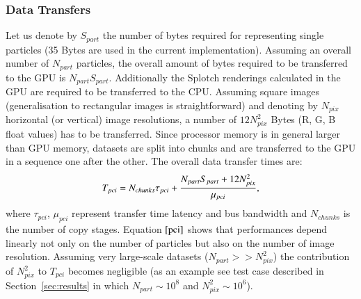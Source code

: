 \documentclass[1p]{elsarticle}
\begin{document}


\subsubsection{Data Transfers}
Let us denote by $S_{part}$ the number of bytes required for representing single particles (35 Bytes are used in the current implementation). Assuming an overall number of $N_{part}$ particles, the overall amount of bytes required to be transferred to the GPU is $N_{part} S_{part}$. Additionally the Splotch renderings calculated in the GPU are required to be transferred to the CPU. Assuming square images (generalisation to rectangular images is straightforward) and denoting by $N_{pix}$ horizontal (or vertical) image resolutions, a number of $12 N_{pix}^2$ Bytes (R, G, B float values) has to be transferred. 
Since processor memory is in general larger than GPU memory,
datasets are split into chunks and are transferred to the GPU in a sequence one after the other. The overall data transfer times are:
\begin{equation}\label{pci}
T_{pci} =  N_{chunks} \tau_{pci} + {N_{part} S_{part} + 12 N_{pix}^2 \over 
\mu_{pci}},
\end{equation}
where $\tau_{pci}$, $\mu_{pci}$ represent transfer time latency and bus bandwidth and $N_{chunks}$ is the number of copy stages. Equation $\eqref{pci}$ shows that performances depend linearly not only on the number of particles but also on the number of image resolution. Assuming very large-scale datasets ($N_{part} >> N_{pix}^2$) the contribution of $N_{pix}^2$ to $T_{pci}$ becomes negligible (as an example see test case described in Section~\ref{sec:results} in which $N_{part} \sim 10^8$
and $N_{pix}^2 \sim 10^6$).
\end{document}
